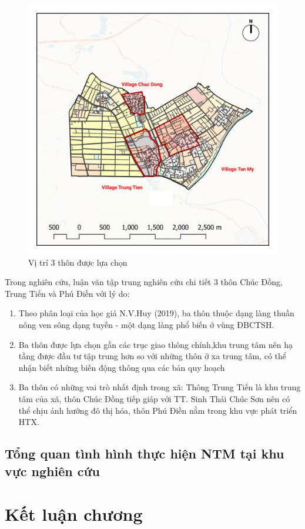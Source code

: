 \documentclass[../thesis.tex]{subfiles}
\begin{document}
\begin{figure}
\includegraphics[width=15cm]{Graphic/Select.jpg}
\caption{Vị trí 3 thôn được lựa chọn}
\end{figure}



Trong nghiên cứu, luận văn tập trung nghiên cứu chi tiết 3 thôn Chúc Đồng, Trung Tiến và Phú Điền với lý do:
\begin{enumerate}
    \item Theo phân loại của học giả N.V.Huy (2019), ba thôn thuộc dạng làng thuần nông ven sông dạng tuyến - một dạng làng phổ biến ở vùng ĐBCTSH.
    \item Ba thôn được lựa chọn gần các trục giao thông chính,khu trung tâm nên hạ tầng được đầu tư tập trung hơn so với những thôn ở xa trung tâm, có thể nhận biết những biến động thông qua các bản quy hoạch
    \item Ba thôn có những vai trò nhất định trong xã: Thông Trung Tiến là khu trung tâm của xã, thôn Chúc Đồng tiếp giáp với TT. Sinh Thái Chúc Sơn nên có thể chịu ảnh hưởng đô thị hóa, thôn Phú Điền nằm trong khu vực phát triển HTX.
\end{enumerate}






\subsection {Tổng quan tình hình thực hiện NTM tại khu vực nghiên cứu}
\section {Kết luận chương}
	
\end{document}
